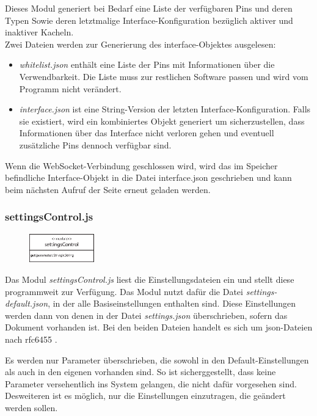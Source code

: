 Dieses Modul generiert bei Bedarf eine Liste der verfügbaren Pins und deren Typen Sowie deren letztmalige Interface-Konfiguration bezüglich aktiver und inaktiver Kacheln.\\

\noindent Zwei Dateien werden zur Generierung des interface-Objektes ausgelesen:

\begin{itemize}
  \item \textit{whitelist.json} enthält eine Liste der Pins mit Informationen über die Verwendbarkeit. Die Liste muss zur restlichen Software passen und wird vom Programm nicht verändert.
  \item \textit{interface.json} ist eine String-Version der letzten Interface-Konfiguration. Falls sie existiert, wird ein kombiniertes Objekt generiert um sicherzustellen, dass Informationen über das Interface nicht verloren gehen und eventuell zusätzliche Pins dennoch verfügbar sind.
\end{itemize}

Wenn die WebSocket-Verbindung geschlossen wird, wird das im Speicher befindliche Interface-Objekt in die Datei interface.json geschrieben und kann beim nächsten Aufruf der Seite erneut geladen werden.

\subsubsection{settingsControl.js}
\begin{figure}
  \vspace{-16pt}
  \centering
  \includegraphics[width = 0.25\textwidth]{documentation/images/apiSettingsControl.eps}
\end{figure}

Das Modul \textit{settingsControl.js} liest die Einstellungsdateien ein und stellt diese programmweit zur Verfügung. Das Modul nutzt dafür die Datei \textit{settings-default.json}, in der alle Basiseinstellungen enthalten sind. Diese Einstellungen werden dann von denen in der Datei \textit{settings.json} überschrieben, sofern das Dokument vorhanden ist. Bei den beiden Dateien handelt es sich um \gls{json}-Dateien nach rfc6455 \cite{rfc6455}.

Es werden nur Parameter überschrieben, die sowohl in den Default-Einstellungen als auch in den eigenen vorhanden sind. So ist sicherggestellt, dass keine Parameter versehentlich ins System gelangen, die nicht dafür vorgesehen sind. Desweiteren ist es möglich, nur die Einstellungen einzutragen, die geändert werden sollen.

